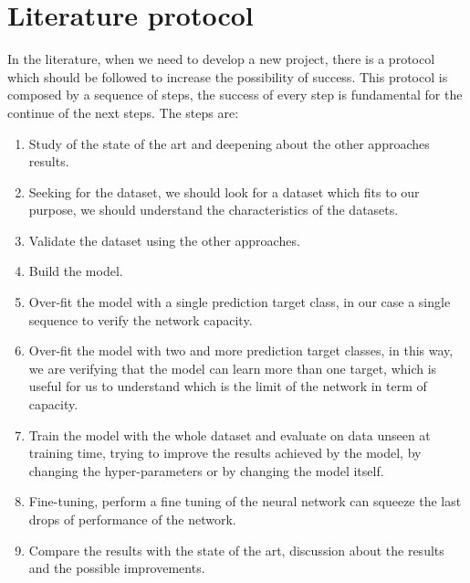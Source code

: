 \section{Literature protocol}\label{sec:literature-protocol}

In the literature, when we need to develop a new project, there is a protocol which should be followed to increase the possibility of success.
This protocol is composed by a sequence of steps, the success of every step is fundamental for the continue of the next steps.
The steps are:
\begin{enumerate}
    \item Study of the state of the art and deepening about the other approaches results.
    \item Seeking for the dataset, we should look for a dataset which fits to our purpose, we should understand the characteristics of the datasets.
    \item Validate the dataset using the other approaches.
    \item Build the model.
    \item Over-fit the model with a single prediction target class, in our case a single sequence to verify the network capacity.
    \item Over-fit the model with two and more prediction target classes, in this way, we are verifying that the model can learn more than one target, which is useful for us to understand which is the limit of the network in term of capacity.
    \item Train the model with the whole dataset and evaluate on data unseen at training time, trying to improve the results achieved by the model, by changing the hyper-parameters or by changing the model itself.
    \item Fine-tuning, perform a fine tuning of the neural network can squeeze the last drops of performance of the network.
    \item Compare the results with the state of the art, discussion about the results and the possible improvements.
\end{enumerate}